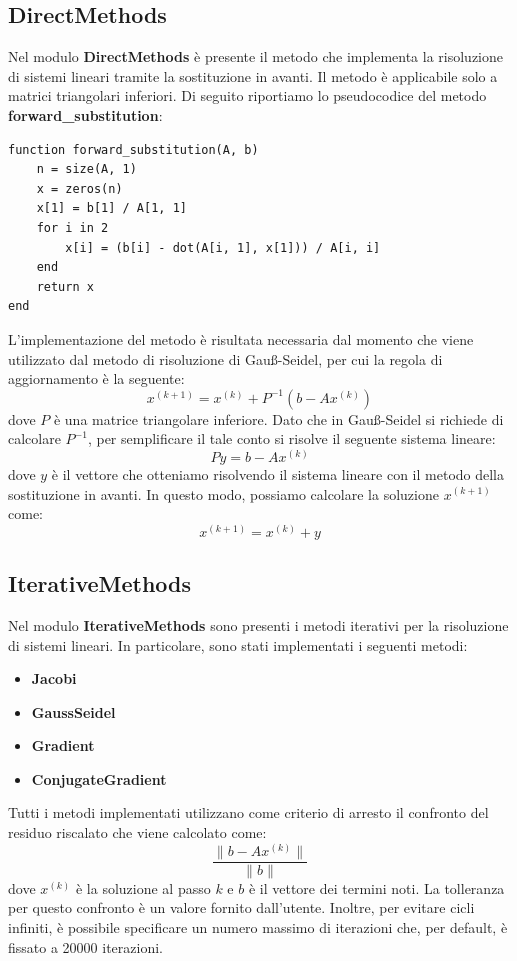 \subsection{DirectMethods}
Nel modulo \textbf{DirectMethods} è presente il metodo che implementa
la risoluzione di sistemi lineari tramite la sostituzione in avanti. Il metodo
è applicabile solo a matrici triangolari inferiori. Di seguito riportiamo lo
pseudocodice del metodo \textbf{forward\_substitution}:
\begin{verbatim}
function forward_substitution(A, b)
    n = size(A, 1)
    x = zeros(n)
    x[1] = b[1] / A[1, 1]
    for i in 2
        x[i] = (b[i] - dot(A[i, 1], x[1])) / A[i, i]
    end
    return x
end
\end{verbatim}
L'implementazione del metodo è risultata necessaria dal momento che viene
utilizzato dal metodo di risoluzione di Gauß-Seidel, per cui la regola di
aggiornamento è la seguente:
\begin{equation}
    x^{(k+1)} = x^{(k)} + P^{-1}(b - Ax^{(k)})
\end{equation}
dove $P$ è una matrice triangolare inferiore. Dato che in Gauß-Seidel si richiede
di calcolare $P^{-1}$, per semplificare il tale conto si risolve il seguente sistema
lineare:
\begin{equation}
    Py = b - Ax^{(k)}
\end{equation}
dove $y$ è il vettore che otteniamo risolvendo il sistema lineare con il metodo
della sostituzione in avanti. In questo modo, possiamo calcolare la soluzione
$x^{(k+1)}$ come:
\begin{equation}
    x^{(k+1)} = x^{(k)} + y
\end{equation}
\subsection{IterativeMethods}
Nel modulo \textbf{IterativeMethods} sono presenti i metodi iterativi per la
risoluzione di sistemi lineari. In particolare, sono stati implementati i seguenti
metodi:
\begin{itemize}
    \item \textbf{Jacobi}
    \item \textbf{GaussSeidel}
    \item \textbf{Gradient}
    \item \textbf{ConjugateGradient}
\end{itemize}

Tutti i metodi implementati utilizzano come criterio di arresto il confronto del
residuo riscalato che viene calcolato come:
\begin{equation}
    \frac{\|b - Ax^{(k)}\|}{\|b\|}
\end{equation}
dove $x^{(k)}$ è la soluzione al passo $k$ e $b$ è il vettore dei termini noti.
La tolleranza per questo confronto è un valore fornito dall'utente.
Inoltre, per evitare cicli infiniti, è possibile specificare un numero massimo
di iterazioni che, per default, è fissato a 20000 iterazioni.

